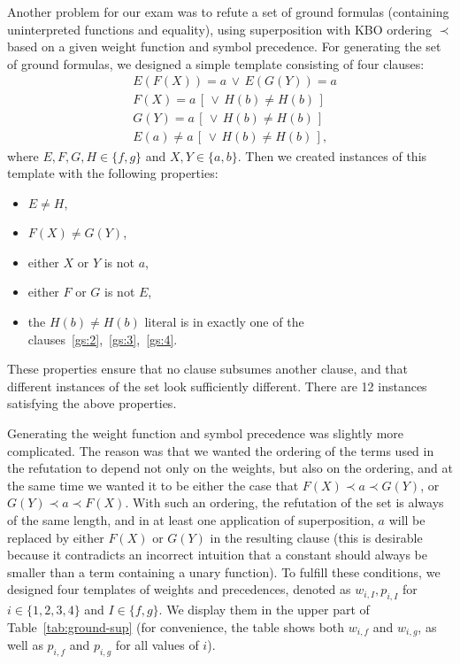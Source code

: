 Another problem for our exam was to refute a set of ground formulas
(containing uninterpreted functions and equality),
using superposition with KBO ordering $\prec$ based on
a given weight function and symbol precedence.
%
For generating the set of ground formulas, we designed a simple
template consisting of four clauses:
\begin{align}
  &E(F(X)) = a \,\lor\, E(G(Y)) = a \label{gs:1} \\
  &F(X) = a \,[\, \lor\, H(b) \not= H(b) \,] \label{gs:2} \\
  &G(Y) = a \,[\, \lor\, H(b) \not= H(b) \,] \label{gs:3} \\
  &E(a) \not= a \,[\, \lor\, H(b) \not= H(b) \,] \label{gs:4},
\end{align}
where $E, F, G, H \in \{f, g\}$ and $X, Y \in \{a, b\}$.
%
Then we created
instances of this template with the following properties:
\begin{itemize}
  \item $E \not = H$,
  \item $F(X) \not = G(Y)$,
  \item either $X$ or $Y$ is not $a$,
  \item either $F$ or $G$ is not $E$,
  \item the $H(b) \not = H(b)$ literal is in exactly one of the
    clauses~\eqref{gs:2},~\eqref{gs:3},~\eqref{gs:4}.
\end{itemize}
These properties ensure that no clause subsumes another clause,
and that different instances of the set look sufficiently different.
There are 12 instances satisfying the above properties.
%

Generating the weight function and symbol precedence was slightly more
complicated. The reason was that we wanted the ordering of the terms used
in the refutation to depend not only on the weights, but also on the ordering,
and at the same time we wanted it to be either
the case that $F(X) \prec a \prec G(Y)$, or $G(Y) \prec a \prec F(X)$. With such an ordering,
the refutation of the set is always of the same length, and in
at least one application of superposition, $a$ will be replaced by either $F(X)$ or $G(Y)$
in the resulting clause (this is desirable because it contradicts
an incorrect intuition that a constant should always be smaller than a term
containing a unary function).
To fulfill these conditions, we designed four templates of weights and precedences,
denoted as $w_{i, I}, p_{i, I}$ for $i \in \{1, 2, 3, 4\}$
and $I \in \{f, g\}$. We display them in the upper part of Table~\ref{tab:ground-sup}
(for convenience, the table shows both $w_{i, f}$ and $w_{i, g}$, as well as
$p_{i, f}$ and $p_{i, g}$ for all values of $i$).

